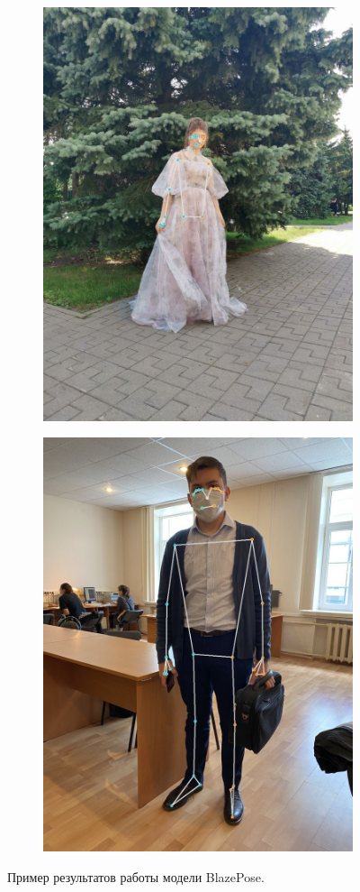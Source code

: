 \begin{figure}[h]
\begin{subfigure}[b]{.5\textwidth}
\end{subfigure}
\begin{subfigure}[b]{.5\textwidth}
	\centering
   \includegraphics[height=\textwidth]{./images/MPPose/36}
   \caption{ }
\end{subfigure}
\begin{subfigure}[b]{.5\textwidth}
	\centering
   \includegraphics[height=\textwidth]{./images/MPPose/33}
   \caption{ }
\end{subfigure}
   \caption{Пример результатов работы модели BlazePose.}
   \label{fig:MP_result}
\end{figure}

